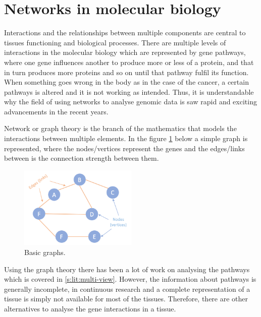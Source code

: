 \section{Networks in molecular biology}

 Interactions and the relationships between multiple components are central to tissues functioning and biological processes. There are multiple levels of interactions in the molecular biology which are represented by gene pathways, where one gene influences another to produce more or less of a protein, and that in turn produces more proteins and so on until that pathway fulfil its function. When something goes wrong in the body as in the case of the cancer, a certain pathways is altered and it is not working as intended. Thus, it is understandable why the field of using networks to analyse genomic data is saw rapid and exciting advancements in the recent years. 
 
Network or graph theory is the branch of the mathematics that models the interactions between multiple elements. In the figure \ref{fig:lit:basic_net} below a simple graph is represented, where the nodes/vertices represent the genes and the edges/links between is the connection strength between them. 

\begin{figure}[!htb]
  \centering\includegraphics[width=0.5\textwidth,height=0.5\textheight,keepaspectratio]{Sections/Lit_review/Resources/basic_graphs.png}
    \caption{Basic graphs.}
    \label{fig:lit:basic_net}
\end{figure}
\FloatBarrier

Using the graph theory there has been a lot of work on analysing the pathways which is covered in \ref{s:lit:multi-view}. However, the information about pathways is generally incomplete, in continuous research and a complete representation of a tissue is simply not available for most of the tissues. Therefore, there are other alternatives to analyse the gene interactions in a tissue.

